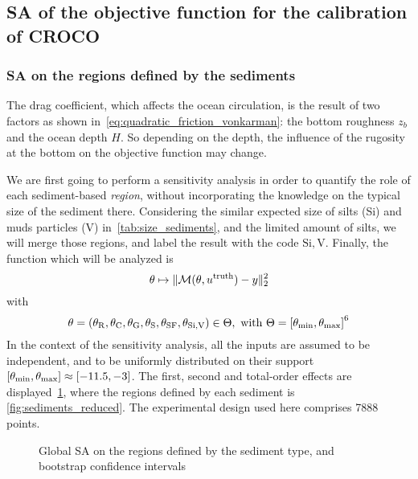 \documentclass[../../Main_ManuscritThese.tex]{subfiles}
\newcommand{\zob}{z_b}
\newcommand\imgpath{/home/victor/acadwriting/Manuscrit/Text/Chapter5/img/}
\begin{document}
\subsection{SA of the objective function for the calibration of CROCO}
\subsubsection{SA on the regions defined by the sediments}
The drag coefficient, which affects the ocean circulation, is the
result of two factors as shown
in~\cref{eq:quadratic_friction_vonkarman}: the bottom roughness $\zob$
and the ocean depth $H$. So depending on the depth, the influence of
the rugosity at the bottom on the objective function may change.

We are first going to perform a sensitivity analysis in order to
quantify the role of each sediment-based \emph{region}, without
incorporating the knowledge on the typical size of the sediment there.
Considering the similar expected size of silts (Si) and muds particles
(V) in~\cref{tab:size_sediments}, and the limited amount of silts, we
will merge those regions, and label the result with the code
$\mathrm{Si,V}$. Finally, the function which will be analyzed is
\begin{equation}
\theta \mapsto \|\mathcal{M}(\theta, u^{\mathrm{truth}}) - y \|_2^2
\end{equation}
with
\begin{equation}
  \kk = (\kk_{\mathrm{R}},\kk_{\mathrm{C}},\kk_{\mathrm{G}},\kk_{\mathrm{S}},
  \kk_{\mathrm{SF}},\kk_{\mathrm{Si,V}})\in\Kspace, \text{ with }
  \Kspace = \interval{\kk_{\min}}{\kk_{\max}}^6
\end{equation}
In the context of the sensitivity analysis, all the inputs are assumed
to be independent, and to be uniformly distributed on their support
$\interval{\kk_{\min}}{\kk_{\max}}\approx
\interval{\num{-11.5}}{\num{-3}}$.  The first, second and total-order
effects are displayed~\cref{fig:SA_sediments}, where the regions
defined by each sediment is \cref{fig:sediments_reduced}. The
experimental design used here comprises \num{7888} points.

\label{ssec:SA_sediments}
\begin{figure}[ht]
  \centering
  
  \caption[SA on the sediments-based regions]{\label{fig:SA_sediments} Global SA on the regions defined by the sediment type, and bootstrap confidence intervals}
\end{figure}
\end{document}

